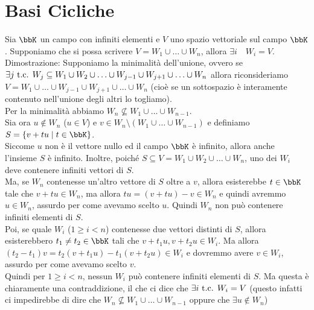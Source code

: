 \documentclass[a4paper,NoNotes,GeneralMath]{stdmdoc}
\newcommand{\nin}{\not\in}
\begin{document}
	\section*{Basi Cicliche}

	Sia $\bbK$ un campo con infiniti elementi e $V$ uno spazio vettoriale sul campo $\bbK$. Supponiamo che si possa scrivere $V = W_1 \cup \ldots \cup W_n$, allora $\exists i \quad W_i = V$. \\
	
	Dimostrazione: Supponiamo la minimalità dell'unione, ovvero se $\exists j \mbox{ t.c. } W_j \subseteq W_1 \cup W_2 \cup \ldots \cup W_{j-1} \cup W_{j+1} \cup \ldots \cup W_n$ allora riconsideriamo $V = W_1 \cup \ldots \cup W_{j-1} \cup W_{j+1} \cup \ldots \cup W_n$ (cioè se un sottospazio è interamente contenuto nell'unione degli altri lo togliamo). \\
	Per la minimalità abbiamo $W_n \nsubseteq W_1 \cup \ldots \cup W_{n-1}$. \\
	Sia ora $u \nin W_n$ ($u \in V$) e $v \in W_n \setminus (W_1 \cup \ldots \cup W_{n-1})$ e definiamo $S = \{v + tu \mid t \in \bbK \}$. \\
	Siccome $u$ non è il vettore nullo ed il campo $\bbK$ è infinito, allora anche l'insieme $S$ è infinito. Inoltre, poiché $S \subseteq V = W_1 \cup W_2 \cup \ldots \cup W_n$, uno dei $W_i$ deve contenere infiniti vettori di $S$. \\
	Ma, se $W_n$ contenesse un'altro vettore di $S$ oltre a $v$, allora esisterebbe $t\in\bbK$ tale che $v+tu \in W_n$, ma allora $tu = (v+tu)-v \in W_n$ e quindi avremmo $u \in W_n$, assurdo per come avevamo scelto $u$. Quindi $W_n$ non può contenere infiniti elementi di $S$. \\
	Poi, se quale $W_i$ ($1\ge i < n$) contenesse due vettori distinti di $S$, allora esisterebbero $t_1 \neq t_2 \in \bbK$ tali che $v+t_1u, v+t_2 u \in W_i$. Ma allora $(t_2-t_1)v = t_2(v+t_1u) - t_1(v+t_2u) \in W_i$ e dovremmo avere $v \in W_i$, assurdo per come avevamo scelto $v$. \\
	Quindi per $1\ge i < n$, nessun $W_i$ può contenere infiniti elementi di $S$. Ma questa è chiaramente una contraddizione, il che ci dice che $\exists i \mbox{ t.c. } W_i = V$ (questo infatti ci impedirebbe di dire che $W_n \nsubseteq W_1 \cup \ldots \cup W_{n-1}$ oppure che $\exists u \nin W_n$)
\end{document}

